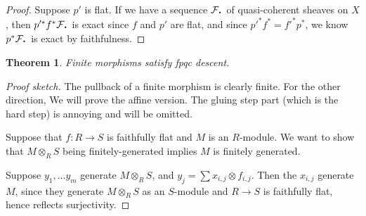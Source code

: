 \documentclass{shortart}
\newtheorem*{thm}{Theorem}
\theoremstyle{definition}
\newcommand*{\Cdot}{{\raisebox{-0.25ex}{\scalebox{1.5}{$\cdot$}}}}
\begin{document}
\begin{proof}
  Suppose $p'$ is flat. If we have a sequence $\mathcal{F}_\Cdot$ of quasi-coherent sheaves on $X$, then $p'^* f^* \mathcal{F}_\Cdot$ is exact since $f$ and $p'$ are flat, and since $p'^* f^* = f'^* p^*$, we know $p^* \mathcal{F}_\Cdot$ is exact by faithfulness.
\end{proof}

\begin{thm}
  Finite morphisms satisfy fpqc descent.
\end{thm}

\begin{proof}[Proof sketch]
  The pullback of a finite morphism is clearly finite. For the other direction, We will prove the affine version. The gluing step part (which is the hard step) is annoying and will be omitted.

  Suppose that $f: R \to S$ is faithfully flat and $M$ is an $R$-module. We want to show that $M \otimes_R S$ being finitely-generated implies $M$ is finitely generated.
  
  Suppose $y_1, \ldots y_m$ generate $M \otimes_R S$, and $y_j = \sum x_{i, j} \otimes f_{i, j}$. Then the $x_{i, j}$ generate $M$, since they generate $M \otimes_R S$ as an $S$-module and $R \to S$ is faithfully flat, hence reflects surjectivity.
\end{proof}


\end{document}
